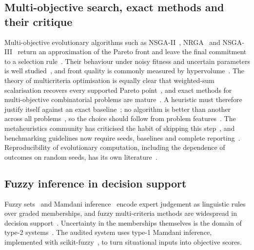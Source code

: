 \documentclass[systems,article,submit,moreauthors,pdftex]{Definitions/mdpi}
\begin{document}
\subsection{Multi-objective search, exact methods and their critique}
Multi-objective evolutionary algorithms such as NSGA-II~\cite{deb2002nsga2}, NRGA~\cite{aljadaan2008nrga}
and NSGA-III~\cite{deb2014nsga3} return an approximation of the Pareto front and leave the
final commitment to a selection rule~\cite{branke2004knees}. Their behaviour under noisy
fitness and uncertain parameters is well studied~\cite{jin2005uncertain,deb2006robustness,beyer2007robust,ide2016robustness},
and front quality is commonly measured by hypervolume~\cite{zitzler1999spea}. The theory of
multicriteria optimisation is equally clear that weighted-sum scalarisation recovers every
supported Pareto point~\cite{ehrgott2005multicriteria,das1998nbi}, and exact methods for
multi-objective combinatorial problems are mature~\cite{ehrgott2000moco}. A heuristic must
therefore justify itself against an exact baseline~\cite{hooker1995testing}; no algorithm
is better than another across all problems~\cite{wolpert1997nfl}, so the choice should
follow from problem features~\cite{kerschke2019selection}. The metaheuristics community has
criticised the habit of skipping this step~\cite{sorensen2015metaphor,aranha2022metaphor},
and benchmarking guidelines now require seeds, baselines and complete
reporting~\cite{bartzbeielstein2020benchmarking}. Reproducibility of evolutionary
computation, including the dependence of outcomes on random seeds, has its own
literature~\cite{lopezibanez2021reproducibility}.

\subsection{Fuzzy inference in decision support}
Fuzzy sets~\cite{zadeh1965fuzzy} and Mamdani inference~\cite{mamdani1975linguistic} encode
expert judgement as linguistic rules over graded memberships, and fuzzy multi-criteria
methods are widespread in decision support~\cite{kahraman2015fuzzymcdm}. Uncertainty in
the memberships themselves is the domain of type-2 systems~\cite{mendel2017uncertain,castillo2008type2}.
The audited system uses type-1 Mamdani inference, implemented with
scikit-fuzzy~\cite{warner2019skfuzzy}, to turn situational inputs into objective scores.
\end{document}
